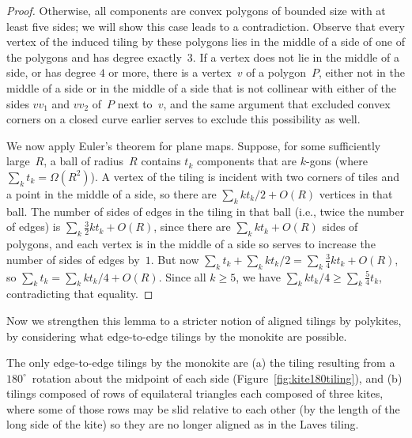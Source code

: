 \begin{proof}
Otherwise, all components are convex polygons of bounded size with at
least five sides; we will show this case leads to a contradiction.  
Observe that every
vertex of the induced tiling by these polygons lies in the middle of a
side of one of the polygons and has degree exactly~$3$.
If a vertex does not lie in the middle of a side, or has
degree $4$ or more, there is a vertex~$v$ of a polygon~$P$, either not
in the middle of a side or in the middle of a side that is not
collinear with either of the sides $vv_1$ and $vv_2$ of~$P$ next
to~$v$, and the same argument that excluded convex corners on a closed
curve earlier serves to exclude this possibility as well.

We now apply Euler's theorem for plane maps.  Suppose, for some
sufficiently large~$R$, a ball of radius~$R$ contains $t_k$ components
that are $k$-gons (where $\sum_k t_k = \Omega(R^2)$).  A vertex of the
tiling is incident with two corners of tiles and a point in the middle
of a side, so there are $\sum_k k t_k / 2 + O(R)$ vertices in that
ball.  The number of sides of edges in the tiling in that ball (i.e.,
twice the number of edges) is $\sum_k \frac{3}{2}k t_k + O(R)$, since
there are $\sum_k k t_k + O(R)$ sides of polygons, and each vertex is
in the middle of a side so serves to increase the number of sides of
edges by~$1$.  But now $\sum_k t_k + \sum_k k t_k / 2 = \sum_k
\frac{3}{4}k t_k + O(R)$, so $\sum_k t_k = \sum_k k t_k / 4 + O(R)$.
Since all $k \ge 5$, we have $\sum_k k t_k / 4 \ge \sum_k \frac{5}{4}
t_k$, contradicting that equality.
\end{proof}

Now we strengthen this lemma to a stricter notion of aligned tilings by
polykites, by considering what edge-to-edge tilings by the monokite
are possible.

\begin{lemma}
The only edge-to-edge tilings by the monokite are (a) the tiling
resulting from a $180^\circ$~rotation about the midpoint of each side
(Figure~\ref{fig:kite180tiling}), and (b) tilings composed of rows of
equilateral triangles each composed of three kites, where some of
those rows may be slid relative to each other (by the length of the
long side of the kite) so they are no longer aligned as in the Laves
tiling.
\end{lemma}

